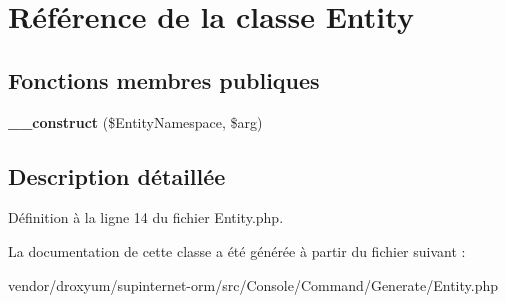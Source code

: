 \hypertarget{class_o_r_m_1_1_console_1_1_command_1_1_generate_1_1_entity}{}\section{Référence de la classe Entity}
\label{class_o_r_m_1_1_console_1_1_command_1_1_generate_1_1_entity}
\subsection*{Fonctions membres publiques}
\begin{DoxyCompactItemize}
\item 
{\bfseries \+\_\+\+\_\+construct} (\$Entity\+Namespace, \$arg)\hypertarget{class_o_r_m_1_1_console_1_1_command_1_1_generate_1_1_entity_a6325d8fb1b536c01225090cd6267fe78}{}\label{class_o_r_m_1_1_console_1_1_command_1_1_generate_1_1_entity_a6325d8fb1b536c01225090cd6267fe78}

\end{DoxyCompactItemize}


\subsection{Description détaillée}


Définition à la ligne 14 du fichier Entity.\+php.



La documentation de cette classe a été générée à partir du fichier suivant \+:\begin{DoxyCompactItemize}
\item 
vendor/droxyum/supinternet-\/orm/src/\+Console/\+Command/\+Generate/Entity.\+php\end{DoxyCompactItemize}
